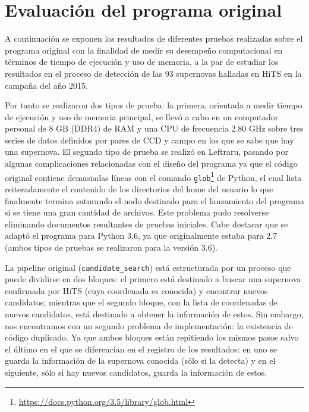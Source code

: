 \chapter{Evaluaci\'on del programa original}
\label{ch:prev_work}

A continuaci\'on se exponen los resultados de diferentes pruebas realizadas sobre el programa original con la finalidad de medir su desempe\~no computacional en t\'erminos de tiempo de ejecuci\'on y uso de memoria, a la par de estudiar los resultados en el proceso de detecci\'on de las 93 supernovas halladas en HiTS en la campa\~na del a\~no 2015.
\bigskip

Por tanto se realizaron dos tipos de prueba: la primera, orientada a medir tiempo de ejecuci\'on y uso de memoria principal, se llev\'o a cabo en un computador personal de 8 GB (DDR4) de RAM y una CPU de frecuencia 2.80 GHz sobre tres series de datos definidos por pares de CCD y campo en los que se sabe que hay una supernova. El segundo tipo de prueba se realiz\'o en Leftraru, pasando por algunas complicaciones relacionadas con el dise\~no del programa ya que el c\'odigo original contiene demasiadas l\'ineas con el comando \texttt{glob}\footnote{\url{https://docs.python.org/3.5/library/glob.html}} de Python, el cual lista reiteradamente el contenido de los directorios del home del usuario lo que finalmente termina saturando el nodo destinado para el lanzamiento del programa si se tiene una gran cantidad de archivos. Este problema pudo resolverse eliminando documentos resultantes de pruebas iniciales. Cabe destacar que se adapt\'o el programa para Python 3.6, ya que originalmente estaba para 2.7 (ambos tipos de pruebas se realizaron para la versi\'on 3.6).
\bigskip

La pipeline original (\texttt{candidate\_search}) est\'a estructurada por un proceso que puede dividirse en dos bloques: el primero est\'a destinado a buscar una supernova confirmada por HiTS (cuya coordenada es conocida) y encontrar nuevos candidatos; mientras que el segundo bloque, con la lista de coordenadas de nuevos candidatos, est\'a destinado a obtener la informaci\'on de estos. Sin embargo, nos encontramos con un segundo problema de implementaci\'on: la existencia de c\'odigo duplicado. Ya que ambos bloques est\'an repitiendo los mismos pasos salvo el \'ultimo en el que se diferencian en el registro de los resultados: en uno se guarda la informaci\'on de la supernova conocida (s\'olo si la detecta) y en el siguiente, s\'olo si hay nuevos candidatos, guarda la informaci\'on de estos.
\bigskip

